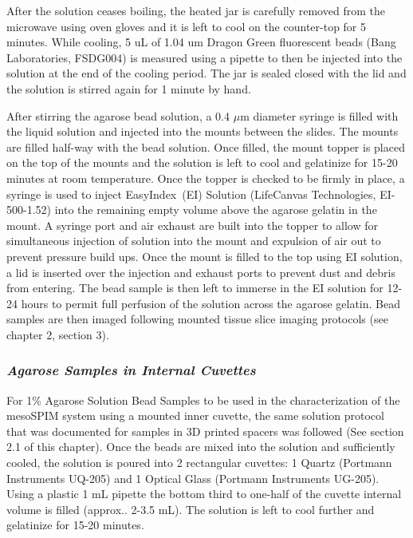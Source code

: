 After the solution ceases boiling, the heated jar is carefully removed from the microwave using oven gloves and it is left to cool on the counter-top for 5 minutes. While cooling, 5 uL of 1.04 um Dragon Green fluorescent beads (Bang Laboratories, FSDG004) is measured using a pipette to then be injected into the solution at the end of the cooling period. The jar is sealed closed with the lid and the solution is stirred again for 1 minute by hand. 

After stirring the agarose bead solution, a 0.4 $\mu$m diameter syringe is filled with the liquid solution and injected into the mounts between the slides. The mounts are filled half-way with the bead solution. Once filled, the mount topper is placed on the top of the mounts and the solution is left to cool and gelatinize for 15-20 minutes at room temperature. Once the topper is checked to be firmly in place, a syringe is used to inject EasyIndex\texttrademark\ (EI) Solution (LifeCanvas Technologies, EI-500-1.52) into the remaining empty volume above the agarose gelatin in the mount. A syringe port and air exhaust are built into the topper to allow for simultaneous injection of solution into the mount and expulsion of air out to prevent pressure build ups. Once the mount is filled to the top using EI solution, a lid is inserted over the injection and exhaust ports to prevent dust and debris from entering. The bead sample is then left to immerse in the EI solution for 12-24 hours to permit full perfusion of the solution across the agarose gelatin. Bead samples are then imaged following mounted tissue slice imaging protocols (see chapter 2, section 3).

\subsubsection{\textit{Agarose Samples in Internal Cuvettes}}

For 1\% Agarose Solution Bead Samples to be used in the characterization of the mesoSPIM system using a mounted inner cuvette, the same solution protocol that was documented for samples in 3D printed spacers was followed (See section 2.1 of this chapter). Once the beads are mixed into the solution and sufficiently cooled, the solution is poured into 2 rectangular cuvettes: 1 Quartz (Portmann Instruments UQ-205) and 1 Optical Glass (Portmann Instruments UG-205). Using a plastic 1 mL pipette the bottom third to one-half of the cuvette internal volume is filled (approx.. 2-3.5 mL). The solution is left to cool further and gelatinize for 15-20 minutes. 

